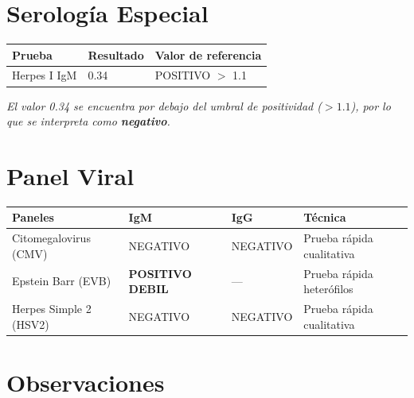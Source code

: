 \documentclass[11pt,a4paper]{article}
\begin{document}
\section*{Serología Especial}

\begin{tcolorbox}[tarjetaDato, title={\faIcon{bug} ~Herpes I --- Técnica ELISA}]
\begin{tabular}{@{}lll@{}}
  \toprule
  \textbf{Prueba} & \textbf{Resultado} & \textbf{Valor de referencia} \\
  \midrule
  Herpes I IgM & 0.34 & POSITIVO $>$ 1.1 \\
  \bottomrule
\end{tabular}

\vspace{4pt}
\emph{El valor 0.34 se encuentra por debajo del umbral de positividad ($>1.1$), por lo que se interpreta como \textbf{negativo}.}
\end{tcolorbox}

\section*{Panel Viral}

\begin{tcolorbox}[tarjetaDato, title={\faIcon{virus} ~Detección cualitativa de anticuerpos}]
\begin{tabular}{@{}llll@{}}
  \toprule
  \textbf{Paneles} & \textbf{IgM} & \textbf{IgG} & \textbf{Técnica} \\
  \midrule
  Citomegalovirus (CMV) & NEGATIVO & NEGATIVO & Prueba rápida cualitativa \\
  Epstein Barr (EVB)    & \textcolor{naranjaVivo}{\textbf{POSITIVO DEBIL}} & --- & Prueba rápida heterófilos \\
  Herpes Simple 2 (HSV2) & NEGATIVO & NEGATIVO & Prueba rápida cualitativa \\
  \bottomrule
\end{tabular}
\end{tcolorbox}

\section*{Observaciones}
\end{document}
